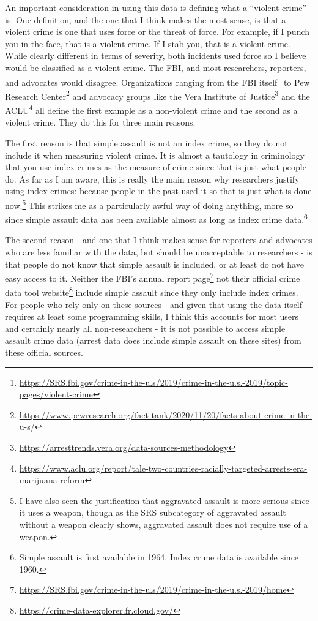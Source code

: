 \documentclass[
]{krantz}
\renewcommand{\href}[2]{#2\footnote{\url{#1}}}
\begin{document}
An important consideration in using this data is defining
what a ``violent crime'' is. One definition, and the one
that I think makes the most sense, is that a violent crime
is one that uses force or the threat of force. For example,
if I punch you in the face, that is a violent crime. If I
stab you, that is a violent crime. While clearly different
in terms of severity, both incidents used force so I believe
would be classified as a violent crime. The FBI, and most
researchers, reporters, and advocates would disagree.
Organizations ranging from the
\href{https://SRS.fbi.gov/crime-in-the-u.s/2019/crime-in-the-u.s.-2019/topic-pages/violent-crime}{FBI
itself} to
\href{https://www.pewresearch.org/fact-tank/2020/11/20/facts-about-crime-in-the-u-s/}{Pew
Research Center} and advocacy groups like the
\href{https://arresttrends.vera.org/data-sources-methodology}{Vera
Institute of Justice} and the
\href{https://www.aclu.org/report/tale-two-countries-racially-targeted-arrests-era-marijuana-reform}{ACLU}
all define the first example as a non-violent crime and the
second as a violent crime. They do this for three main
reasons.

The first reason is that simple assault is not an index
crime, so they do not include it when measuring violent
crime. It is almost a tautology in criminology that you use
index crimes as the measure of crime since that is just what
people do. As far as I am aware, this is really the main
reason why researchers justify using index crimes: because
people in the past used it so that is just what is done
now.\footnote{I have also seen the justification that
  aggravated assault is more serious since it uses a weapon,
  though as the SRS subcategory of aggravated assault
  without a weapon clearly shows, aggravated assault does
  not require use of a weapon.} This strikes me as a
particularly awful way of doing anything, more so since
simple assault data has been available almost as long as
index crime data.\footnote{Simple assault is first available
  in 1964. Index crime data is available since 1960.}

The second reason - and one that I think makes sense for
reporters and advocates who are less familiar with the data,
but should be unacceptable to researchers - is that people
do not know that simple assault is included, or at least do
not have easy access to it. Neither the FBI's annual report
\href{https://SRS.fbi.gov/crime-in-the-u.s/2019/crime-in-the-u.s.-2019/home}{page}
not their official
\href{https://crime-data-explorer.fr.cloud.gov/}{crime data
tool website} include simple assault since they only include
index crimes. For people who rely only on these sources -
and given that using the data itself requires at least some
programming skills, I think this accounts for most users and
certainly nearly all non-researchers - it is not possible to
access simple assault crime data (arrest data does include
simple assault on these sites) from these official sources.
\end{document}
